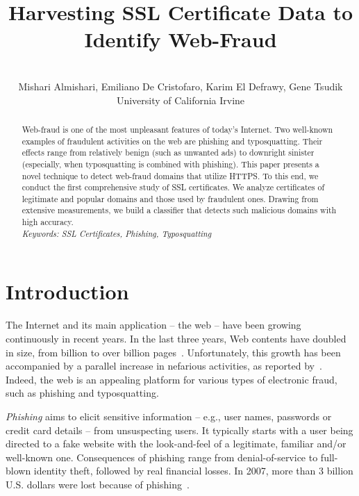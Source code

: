 \documentclass[twocolumn]{article}
\title{\huge\bf Harvesting SSL Certificate Data to\\Identify Web-Fraud}
\author{~\\ Mishari Almishari, Emiliano De Cristofaro, Karim El Defrawy, Gene Tsudik \vspace{0.1cm}\\
{University of California Irvine
   }\\
}
\date{}
\begin{document}
\maketitle
\thispagestyle{empty}
\begin{abstract}
Web-fraud is one of the most unpleasant features of today's Internet.
Two well-known examples of fraudulent activities on the web are phishing and typosquatting.
Their effects range from relatively benign (such as unwanted ads) to
downright sinister (especially, when typosquatting is combined with phishing).
This paper presents a novel technique to detect web-fraud domains that
utilize HTTPS. To this end, we conduct the first comprehensive study
of SSL certificates. We analyze certificates of legitimate and popular domains and
those used by fraudulent ones. Drawing from extensive measurements, we build
a classifier that detects such malicious domains with high accuracy. \vspace*{0.1cm}
~\\
{\it Keywords: SSL Certificates, Phishing, Typosquatting}
\end{abstract}


 \section{Introduction}\label{sec:introduction}
The Internet and its main application -- the web -- have been growing
continuously in recent years. In the last three years, Web contents have doubled in size, 
from  billion to over  billion pages~\cite{wwwsize}.
Unfortunately, this growth has been accompanied by a parallel increase in nefarious activities, as reported by~\cite{incr}.
Indeed, the web is an appealing platform for various types of electronic fraud, such as {phishing} and
{typosquatting}.

 \emph{Phishing} aims to elicit sensitive information 
-- e.g., user names, passwords or credit card details -- from unsuspecting users. 
It typically starts with a user being directed to a fake website with
the look-and-feel of a legitimate, familiar and/or well-known one.
Consequences of phishing range from denial-of-service to
full-blown identity theft, followed by real financial losses. In 2007, more than
3 billion U.S. dollars were lost because of phishing~\cite{phishloss2007}. 
\end{document}
